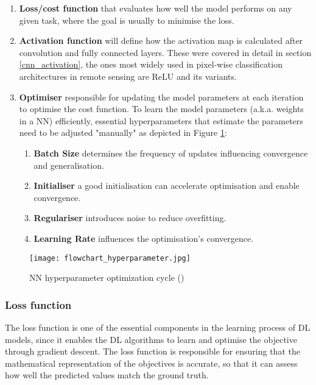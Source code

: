 \begin{enumerate}
    \item \textbf{Loss/cost function} that evaluates how well the model performs on any given task, where the goal is usually to minimise the loss.
    \item \textbf{Activation function} will define how the activation map is calculated after convolution and fully connected layers. These were covered in detail in section \ref{cnn_activation}, the ones most widely used in pixel-wise classification architectures in remote sensing are \gls{ReLU} and its variants.
    \item \textbf{Optimiser} responsible for updating the model parameters at each iteration to optimise the cost function. To learn the model parameters (\gls{a.k.a.} weights in a \gls{NN}) efficiently, essential hyperparameters that estimate the parameters need to be adjusted "manually" as depicted in Figure \ref{fig_hyperparameter}:
        \begin{enumerate}
            \item \textbf{Batch Size} determines the frequency of updates influencing convergence and generalisation.
            \item \textbf{Initialiser} a good initialisation can accelerate optimisation and enable convergence.
            \item \textbf{Regulariser} introduces noise to reduce overfitting.
            \item \textbf{Learning Rate} influences the optimisation’s convergence.
        \end{enumerate}
        
\end{enumerate}

    \begin{figure}[hbt!]
        \centering
        \texttt{[image: flowchart\_hyperparameter.jpg]}
        \caption{NN hyperparameter optimization cycle (\cite{hyperparameter_fig})}
        \label{fig_hyperparameter}
    \end{figure}
\subsubsection{Loss function} \label{loss_functions}
The loss function is one of the essential components in the learning process of \gls{DL} models, since it enables the \gls{DL} algorithms to learn and optimise the objective through gradient descent. The loss function is responsible for ensuring that the mathematical representation of the objectives is accurate, so that it can assess how well the predicted values match the ground truth.

